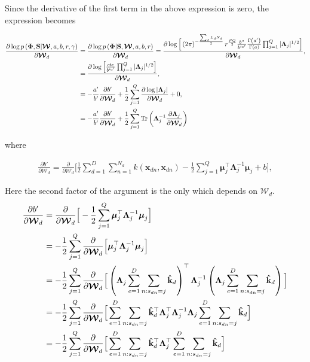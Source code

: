 \documentclass[]{article}
\newcommand{\dWj}{\partial\projMat}
\newcommand{\kernel}[2]{k\left(#1,#2\right)}
\newcommand{\C}{\boldsymbol{\Lambda}_j}
\newcommand{\muJ}{\boldsymbol{\mu}_j}
\newcommand{\W}{\boldsymbol{\mathcal{W}}}
\newcommand{\indobj}{\mathbf{x}_{dn}}
\newcommand{\projMat}{\boldsymbol{\mathcal{W}}_d}
\newcommand{\kawx}{\mathbf{\hat{k}}_d }
\begin{document}
Since the derivative of the first term in the above expression is zero, the expression becomes

\begin{align}
\frac{\partial \log p\left(\boldsymbol{\Phi},\mathbf{S}|\W,a,b,r,\gamma\right)}{\partial\projMat} &=
\frac{\partial \log p\left(\boldsymbol{\Phi}|\mathbf{S},\boldsymbol{\mathcal{W}},a,b,r\right)}{\partial\projMat} = \frac{\partial \log \Big[\left(2\pi\right)^{-\frac{\sum_d L_d N_d}{2}}r^{\frac{PQ}{2}}\frac{b^{a}}{b'^{a'}}\frac{\Gamma\left(a'\right)}{\Gamma\left(a\right)}\prod_{j=1}^{Q}|\C|^{1/2}\Big]}{\partial\projMat},\notag\\
&= \frac{\partial \log \Big[\frac{cte}{b'^{a'}} \prod_{j=1}^{Q}|\C|^{1/2}\Big]}{\partial\projMat}\notag,\\
& = -\frac{a'}{b'}\frac{\partial b'}{\dWj}+\frac{1}{2}\sum_{j=1}^{Q}\frac{\partial \log |\C|}{\dWj}+0 , \notag \\
& =  -\frac{a'}{b'}\frac{\partial b'}{\dWj}+\frac{1}{2}\sum_{j=1}^{Q} \operatorname{Tr}\left(\C^{-1}\frac{\partial \C}{\dWj}\right)
\label{eq:derivativeW1}
\end{align}

where

\begin{align}
\frac{\partial b'}{\dWj} = \frac{\partial}{\dWj}\Big[ \frac{1}{2} \sum_{d=1}^{D}\sum_{n=1}^{N_d}\kernel{\indobj}{\indobj} -\frac{1}{2}\sum_{j=1}^{Q}\muJ^\top\C^{-1}\muJ +b \Big],
\end{align}

Here the second factor of the argument is the only which depends on $\projMat$.
\begin{align}
\frac{\partial b'}{\dWj} &= \frac{\partial}{\dWj}\Big[-\frac{1}{2}\sum_{j=1}^{Q}\muJ^\top\C^{-1}\muJ \Big] \notag \\
&=-\frac{1}{2}\sum_{j=1}^{Q}\frac{\partial}{\dWj}\Big[\muJ^\top\C^{-1}\muJ \Big] \notag \\
&= -\frac{1}{2}\sum_{j=1}^{Q}\frac{\partial}{\dWj}\Big[\left(\C\sum\limits_{e=1}^{D}{\sum\limits_{n:s_{dn}=j}\kawx}\right)^\top\C^{-1}\left(\C\sum\limits_{e=1}^{D}{\sum\limits_{n:s_{dn}=j}\kawx}\right) \Big] \notag \\
&= -\frac{1}{2}\sum_{j=1}^{Q}\frac{\partial}{\dWj}\Big[\sum\limits_{e=1}^{D}{\sum\limits_{n:s_{dn}=j}\kawx^\top} \C^\top \C^{-1}\C\sum\limits_{e=1}^{D}{\sum\limits_{n:s_{dn}=j}\kawx}\Big] \notag \\
&= -\frac{1}{2}\sum_{j=1}^{Q}\frac{\partial}{\dWj}\Big[\sum\limits_{e=1}^{D}{\sum\limits_{n:s_{dn}=j}\kawx^\top} \C^\top \sum\limits_{e=1}^{D}{\sum\limits_{n:s_{dn}=j}\kawx}\Big]
\end{align}
\end{document}
